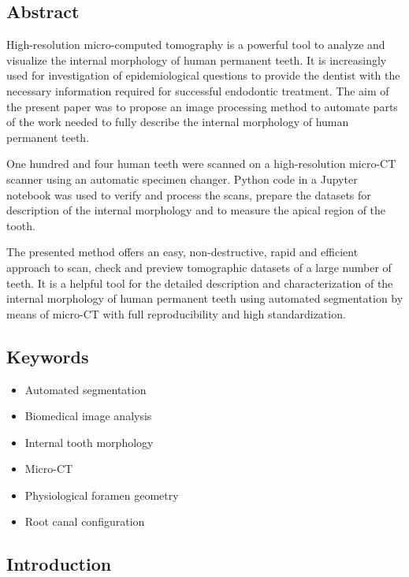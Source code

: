 \documentclass[
  american,
]{article}
\providecommand{\tightlist}{%
  \setlength{\itemsep}{0pt}\setlength{\parskip}{0pt}}
\begin{document}
\hypertarget{abstract}{%
\subsection{Abstract}\label{abstract}}

High-resolution micro-computed tomography is a powerful tool to analyze and visualize the internal morphology of human permanent teeth.
It is increasingly used for investigation of epidemiological questions to provide the dentist with the necessary information required for successful endodontic treatment.
The aim of the present paper was to propose an image processing method to automate parts of the work needed to fully describe the internal morphology of human permanent teeth.

One hundred and four human teeth were scanned on a high-resolution micro-CT scanner using an automatic specimen changer.
Python code in a Jupyter notebook was used to verify and process the scans, prepare the datasets for description of the internal morphology and to measure the apical region of the tooth.

The presented method offers an easy, non-destructive, rapid and efficient approach to scan, check and preview tomographic datasets of a large number of teeth.
It is a helpful tool for the detailed description and characterization of the internal morphology of human permanent teeth using automated segmentation by means of micro-CT with full reproducibility and high standardization.

\hypertarget{keywords}{%
\subsection{Keywords}\label{keywords}}

\begin{itemize}
\tightlist
\item
  Automated segmentation
\item
  Biomedical image analysis
\item
  Internal tooth morphology
\item
  Micro-CT
\item
  Physiological foramen geometry
\item
  Root canal configuration
\end{itemize}

\hypertarget{introduction}{%
\subsection{Introduction}\label{introduction}}
\end{document}
